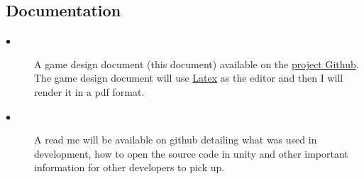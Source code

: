 \documentclass[a4paper]{scrreprt}
\begin{document}
\subsection{Documentation}

\begin{description}
    \item[$\bullet$] A game design document (this document) available on the \href{https://github.com/cian2009/UnityGame}{project Github}. The game design document will use \href{https://www.latex-project.org/}{Latex} as the editor and then I will render it in a pdf format.
    \item[$\bullet$] A read me will be available on github detailing what was used in development, how to open the source code in unity and other important information for other developers to pick up.
\end{description}
\end{document}
